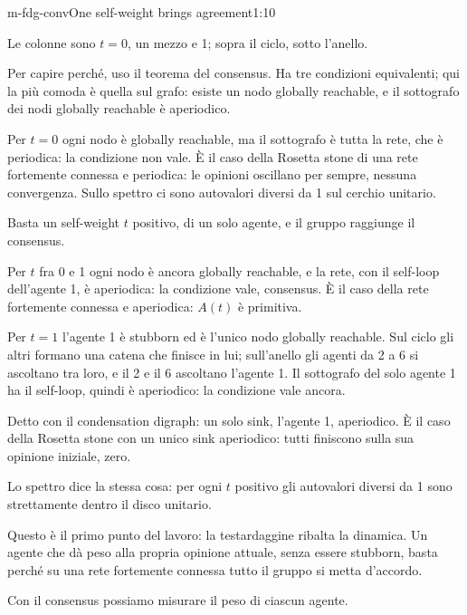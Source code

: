 \begin{slide}{m-fdg-conv}{One self-weight brings agreement}{1:10 {\color{red}}}
  \begin{discorso}
    \item Le colonne sono $t=0$, un mezzo e 1; sopra il ciclo, sotto l'anello.
    \item {\color{blue}Per capire perché, uso il teorema del consensus. Ha tre condizioni equivalenti; qui la più comoda è quella sul grafo: esiste un nodo globally reachable, e il sottografo dei nodi globally reachable è aperiodico.}
    \item Per $t=0$ {\color{red}   } {\color{blue}ogni nodo è globally reachable, ma il sottografo è tutta la rete, che è periodica: la condizione non vale. È il caso della Rosetta stone di una rete fortemente connessa} e {\color{blue}periodica:} le opinioni oscillano per {\color{red}} {\color{blue}sempre,} nessuna convergenza. Sullo spettro ci sono autovalori diversi da 1 sul cerchio unitario.
    \item Basta un self-weight $t$ positivo, di un solo agente, e il gruppo raggiunge il consensus.
    \item Per $t$ fra 0 e 1 {\color{blue}ogni nodo è ancora globally reachable, e} la {\color{blue}rete, con il self-loop dell'agente 1, è aperiodica: la condizione vale, consensus. È il caso della} rete {\color{red}} fortemente connessa e {\color{red}   } {\color{blue}aperiodica:} $A(t)$ è {\color{red} } {\color{blue}primitiva.}
    \item Per $t=1$ l'agente 1 è stubborn ed è l'unico nodo globally {\color{red}       } {\color{blue}reachable. Sul ciclo gli altri formano una catena che finisce in lui; sull'anello gli agenti da 2 a 6 si ascoltano tra loro, e il 2 e il 6 ascoltano l'agente 1. Il sottografo del solo agente 1 ha il self-loop, quindi è aperiodico: la condizione vale ancora.}
    \item {\color{blue}Detto con il condensation digraph: un solo sink, l'agente 1, aperiodico. È il caso della Rosetta stone con un unico sink aperiodico: tutti finiscono sulla sua opinione iniziale, zero.}
    \item {\color{red}} {\color{blue}Lo spettro dice la stessa cosa: per} ogni $t$ positivo gli autovalori diversi da 1 sono {\color{red}} strettamente dentro il disco unitario.
    \item Questo è il primo punto del lavoro: la testardaggine ribalta la dinamica. Un agente che dà peso alla propria opinione attuale, senza essere stubborn, basta perché su una rete fortemente connessa tutto il gruppo si metta d'accordo.
    \item Con il consensus possiamo misurare il peso di ciascun agente.
  \end{discorso}
\end{slide}

